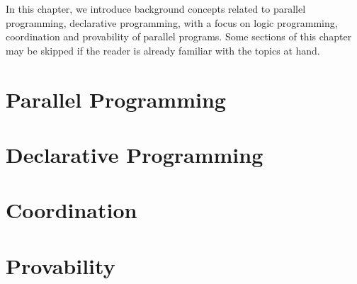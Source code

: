 In this chapter, we introduce background concepts related to parallel
programming, declarative programming, with a focus on logic programming,
coordination and provability of parallel programs. Some sections of this chapter
may be skipped if the reader is already familiar with the topics at hand.

\section{Parallel Programming}


\section{Declarative Programming}\label{section:background:declarative}


\section{Coordination}


\section{Provability}

